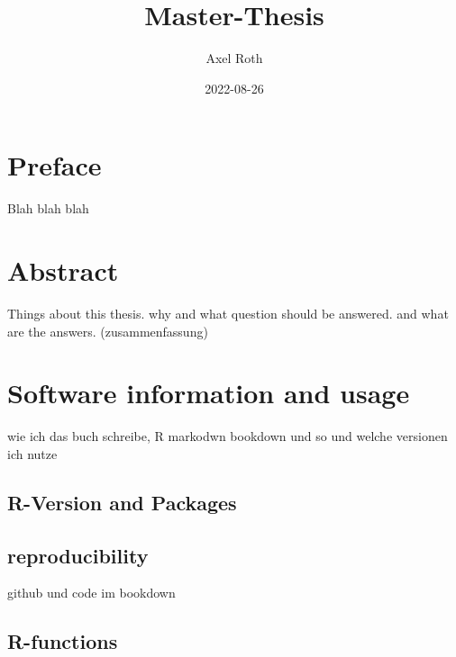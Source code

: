 \documentclass[
  oneside]{book}
\title{Master-Thesis}
\author{Axel Roth}
\date{2022-08-26}
\begin{document}
\maketitle

{
\setcounter{tocdepth}{1}
\tableofcontents
}
\hypertarget{preface}{%
\chapter*{Preface}\label{preface}}

\renewcommand{\chaptermark}[1]{\markboth{\uppercase{#1}}{\uppercase{#1}}}

Blah blah blah

\renewcommand{\chaptermark}[1]{\markboth{\uppercase{\thechapter. \ #1}}{}}

\hypertarget{abstract}{%
\chapter{Abstract}\label{abstract}}

Things about this thesis. why and what question should be answered. and what are the answers. (zusammenfassung)

\hypertarget{software-information-and-usage}{%
\chapter{Software information and usage}\label{software-information-and-usage}}

wie ich das buch schreibe, R markodwn bookdown und so und welche versionen ich nutze

\hypertarget{r-version-and-packages}{%
\section{R-Version and Packages}\label{r-version-and-packages}}

\hypertarget{reproducibility}{%
\section{reproducibility}\label{reproducibility}}

github und code im bookdown

\hypertarget{r-functions}{%
\section{R-functions}\label{r-functions}}
\end{document}
